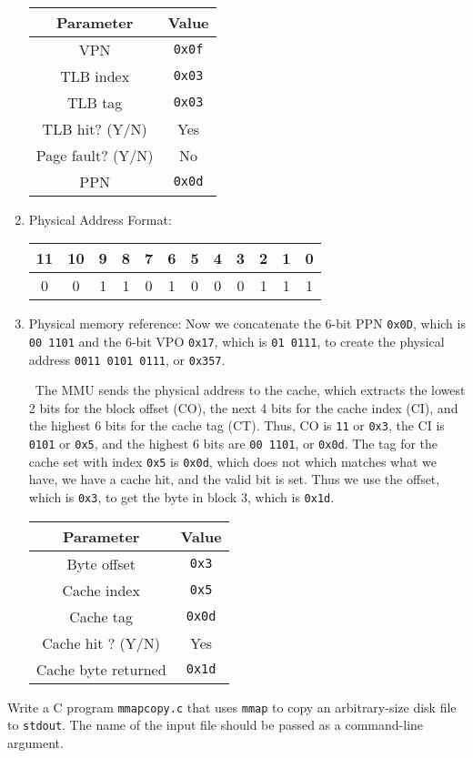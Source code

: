 \documentclass[12pt]{article}
\newenvironment{ex}[2][Exercise]{\begin{trivlist}
		\item[\hskip \labelsep {\bfseries #1}\hskip \labelsep {\bfseries #2.}]}{\end{trivlist}}
\newenvironment{sol}[1][Solution]{\begin{trivlist}
		\item[\hskip \labelsep {\bfseries #1:}]}{\end{trivlist}}
\begin{document}
\begin{sol}
\begin{enumerate}[label=(\alph*)]
		\
		\begin{center}
			\begin{tabular}{cc}
				Parameter & Value\\
				\hline
				VPN & \texttt{0x0f} \\
				TLB index & \texttt{0x03} \\
				TLB tag & \texttt{0x03} \\
				TLB hit? (Y/N) & Yes\\
				Page fault? (Y/N) & No \\
				PPN & \texttt{0x0d}
			\end{tabular}
		\end{center}
		\item Physical Address Format:
				\begin{center}
			\begin{tabular}{|c|c|c|c|c|c|c|c|c|c|c|c|}
				11 & 10 & 9 & 8 & 7 & 6 & 5 & 4 & 3 & 2 & 1 & 0\\
				\hline
				0 & 0 & 1 & 1 & 0 & 1 & 0 & 0 & 0 & 1 & 1 & 1\\
				\hline
			\end{tabular}
		\end{center}
		\item Physical memory reference:
		Now we concatenate the 6-bit PPN \texttt{0x0D}, which is \texttt{00 1101} and the 6-bit VPO
		\texttt{0x17}, which is \texttt{01 0111}, to create the physical address \texttt{0011 0101 0111},
		or \texttt{0x357}.
		
		\
		The MMU sends the physical address to the cache, which extracts the lowest 2 bits for the
		block offset (CO), the next 4 bits for the cache index (CI), and the highest 6 bits
		for the cache tag (CT). Thus, CO is \texttt{11} or \texttt{0x3}, the CI is
		\texttt{0101} or \texttt{0x5}, and the highest 6 bits are \texttt{00 1101}, or \texttt{0x0d}.
		The tag for the cache set with index \texttt{0x5} is \texttt{0x0d}, which does not
		which matches what we have, we have a cache hit, and the valid bit is set. Thus we
		use the offset, which is \texttt{0x3}, to get the byte in block 3, which is \texttt{0x1d}.
			\begin{center}
				\begin{tabular}{cc}
					Parameter & Value\\
					\hline
					Byte offset & \texttt{0x3}\\
					Cache index & \texttt{0x5}\\
					Cache tag & \texttt{0x0d}\\
					Cache hit ? (Y/N) & Yes\\
					Cache byte returned & \texttt{0x1d}
				\end{tabular}
			\end{center}
	\end{enumerate}
\end{sol}

\begin{ex}{9.5}
	Write a C program \texttt{mmapcopy.c} that uses \texttt{mmap} to copy an arbitrary-size
	disk file to \texttt{stdout}. The name of the input file should be passed as a command-line
	argument.
\end{ex}
\end{document}
